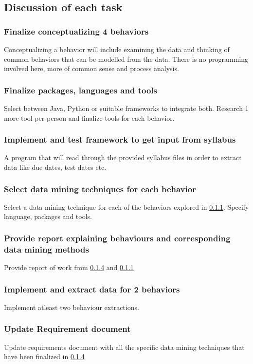 \documentclass[12pt]{article}
\begin{document}
	\subsection{Discussion of each task}
	\subsubsection{Finalize conceptualizing 4 behaviors } \label{behs}
	Conceptualizing a behavior will include examining the data and thinking of common behaviors that can be modelled from the data. There is no programming involved here, more of common sense and process analysis.
	\subsubsection{Finalize packages, languages and tools}
	Select between Java, Python or suitable frameworks to integrate both. Research 1 more tool per person and finalize tools for each behavior. 
	\subsubsection{Implement and test framework to get input from syllabus}
	A program that will read through the provided syllabus files in order to extract data like due dates, test dates etc.
	\subsubsection{Select data mining techniques for each behavior} \label{techs}
	Select a data mining technique for each of the behaviors explored in \ref{behs}. Specify language, packages and tools.
	\subsubsection{Provide report explaining behaviours and corresponding data mining methods}
	Provide report of work from \ref{techs} and \ref{behs}
	\subsubsection{Implement and extract data for 2 behaviors}
	Implement atleast two behaviour extractions.
	\subsubsection{Update Requirement document}
	Update requirements document with all the specific data mining techniques that have been finalized in \ref{techs}
	\pagebreak
\end{document}
